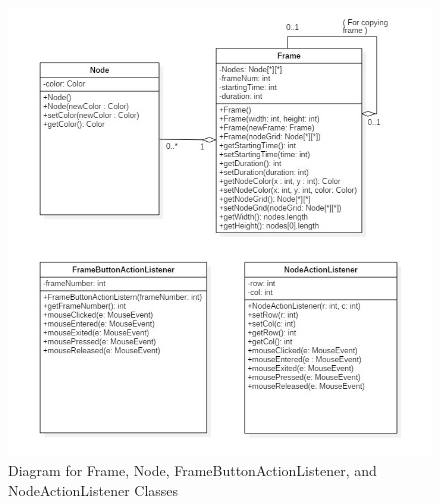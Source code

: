 \documentclass[12pt]{article}
\begin{document}
    \begin{figure}[ht!]
    \centering
    \includegraphics[width=\linewidth]{Class_Diagram_Frame_Node_and_ActionListener_Classes.JPG}
    \caption{Diagram for Frame, Node, FrameButtonActionListener, and NodeActionListener Classes}
  \end{figure}

\end{document}
